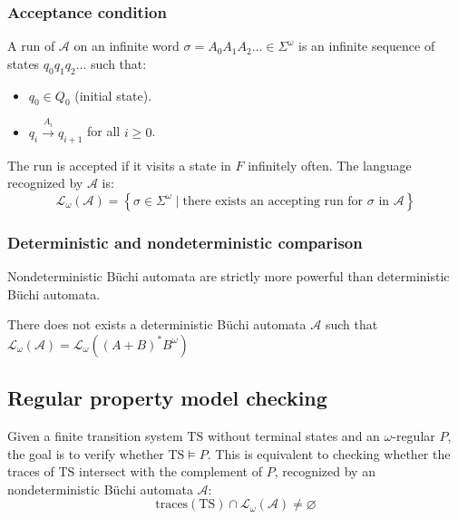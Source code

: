 \subsubsection{Acceptance condition}
A run of $\mathcal{A}$ on an infinite word $\sigma=A_0A_1A_2\dots\in\Sigma^\omega$ is an infinite sequence of states $q_0q_1q_2\dots$ such that: 
\begin{itemize}
    \item $q_0\in Q_0$ (initial state). 
    \item $q_i\overset{A_i}{\rightarrow}q_{i+1}$ for all $i\geq 0$. 
\end{itemize}
\noindent The run is accepted if it visits a state in $F$ infinitely often.
The language recognized by $\mathcal{A}$ is: 
\[\mathcal{L}_{\omega}(\mathcal{A})=\left\{\sigma\in\Sigma^\omega\mid\text{there exists an accepting run for }\sigma\text{ in }\mathcal{A}\right\}\]

\subsubsection{Deterministic and nondeterministic comparison}
Nondeterministic Büchi automata are strictly more powerful than deterministic Büchi automata. 
\begin{theorem}
    There does not exists a deterministic Büchi automata $\mathcal{A}$ such that $\mathcal{L}_{\omega}(\mathcal{A})=\mathcal{L}_{\omega}((A+B)^\ast B^\omega)$
\end{theorem}

\subsection{Regular property model checking}
Given a finite transition system $\text{TS}$ without terminal states and an $\omega$-regular $P$, the goal is to verify whether $\text{TS} \models P$.
This is equivalent to checking whether the traces of $\text{TS}$ intersect with the complement of $P$, recognized by an nondeterministic Büchi automata $\mathcal{A}$: 
\[\text{traces}(\text{TS})\cap\mathcal{L}_{\omega}(\mathcal{A})\neq\varnothing\]

